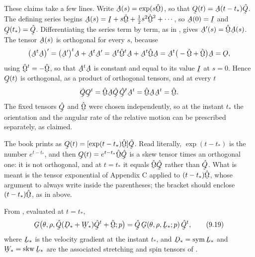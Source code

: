 These claims take a few lines. Write $\bA(s)=\exp(s\hat{\bOm})$, so that
$\bQ(t)=\bA(t-t_{*})\hat\bQ$. The defining series begins
$\bA(s)=\I+s\hat{\bOm}+\tfrac12 s^{2}\hat{\bOm}^{2}+\cdots$, so
$\bA(0)=\I$ and $\bQ(t_{*})=\hat\bQ$. Differentiating the series term
by term, as in , gives $\bA'(s)=\hat{\bOm}\bA(s)$. The tensor
$\bA(s)$ is orthogonal for every $s$, because
\[
   \big(\bA^{t}\bA\big)'=\big(\bA'\big)^{t}\bA+\bA^{t}\bA'
   =\bA^{t}\hat{\bOm}^{t}\bA+\bA^{t}\hat{\bOm}\bA
   =\bA^{t}\big(-\hat{\bOm}+\hat{\bOm}\big)\bA=\Ob,
\]
using $\hat{\bOm}^{t}=-\hat{\bOm}$, so that $\bA^{t}\bA$ is constant and
equal to its value $\I$ at $s=0$. Hence $\bQ(t)$ is orthogonal, as a
product of orthogonal tensors, and at every $t$
\[
   \dot\bQ\bQ^{t}=\hat{\bOm}\bA\hat\bQ\,\hat\bQ^{t}\bA^{t}
   =\hat{\bOm}\bA\bA^{t}=\hat{\bOm}.
\]
The fixed tensors $\hat\bQ$ and $\hat{\bOm}$ were chosen independently,
so at the instant $t_{*}$ the orientation and the angular rate of the
relative motion can be prescribed separately, as claimed.

\begin{remark}
\label{rem:ch9exp}
The book prints  as $\bQ(t)=[\exp(t-t_{*})\hat{\bOm}]\hat\bQ$.
Read literally, $\exp(t-t_{*})$ is the number $e^{t-t_{*}}$, and then
$\bQ(t)=e^{t-t_{*}}\hat{\bOm}\hat\bQ$ is a skew tensor times an
orthogonal one: it is not orthogonal, and at $t=t_{*}$ it equals
$\hat{\bOm}\hat\bQ$ rather than $\hat\bQ$. What is meant is the tensor
exponential of Appendix C applied to $(t-t_{*})\hat{\bOm}$, whose
argument  to  always write inside the parentheses;
the bracket should enclose $(t-t_{*})\hat{\bOm}$, as in 
above.
\end{remark}

From , evaluated at $t=t_{*}$,
\begin{equation}
   \bG\big(\theta,\rho,\hat\bQ(\bD_{*}+\bW_{*})\hat\bQ^{t}
   +\hat{\bOm};p\big)
   =\hat\bQ\,\bG(\theta,\rho,\bL_{*};p)\,\hat\bQ^{t},
   \tag{9.19}\label{eq:9.19}
\end{equation}
where $\bL_{*}$ is the velocity gradient at the instant $t_{*}$, and
$\bD_{*}=\Sym\bL_{*}$ and $\bW_{*}=\Skw\bL_{*}$ are the associated
stretching and spin tensors of .


